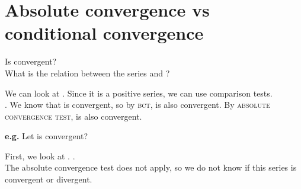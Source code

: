 \newpage

\section{Absolute convergence vs conditional convergence}
Is  convergent? \\
What is the relation between the series  and ?


We can look at . Since it is a positive series, we can use comparison tests. \\
. We know that  is convergent, so by \textsc{bct},  is also convergent. By \textsc{absolute convergence test},  is also convergent.

\textbf{e.g.} Let  \DS{\quad} is  convergent?

First, we look at . . \\
The absolute convergence test does not apply, so we do not know if this series is convergent or divergent.



